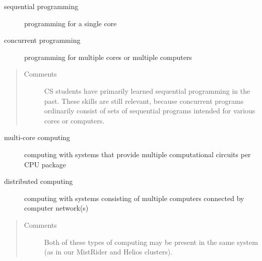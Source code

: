 \documentclass[letterpaper,10pt,english]{sphinxmanual}
\begin{document}
\begin{description}
\item[{sequential programming}] \leavevmode{}\label{Introduction/Introduction:term-sequential-programming}
programming for a single core

\end{description}
\begin{description}
\item[{concurrent programming}] \leavevmode{}\label{Introduction/Introduction:term-concurrent-programming}
programming for multiple cores or multiple computers

\end{description}
\begin{quote}\begin{description}
\item[{Comments}] \leavevmode
CS students have primarily learned sequential programming in the past. These skills are still relevant, because concurrent programs ordinarily consist of sets of sequential programs intended for various cores or computers.

\end{description}\end{quote}
\begin{description}
\item[{multi-core computing}] \leavevmode{}\label{Introduction/Introduction:term-multi-core-computing}
computing with systems that provide multiple computational circuits per CPU package

\end{description}
\begin{description}
\item[{distributed computing}] \leavevmode{}\label{Introduction/Introduction:term-distributed-computing}
computing with systems consisting of multiple computers connected by computer network(s)

\end{description}
\begin{quote}\begin{description}
\item[{Comments}] \leavevmode
Both of these types of computing may be present in the same system (as in our MistRider and Helios clusters).

\end{description}\end{quote}
\end{document}
